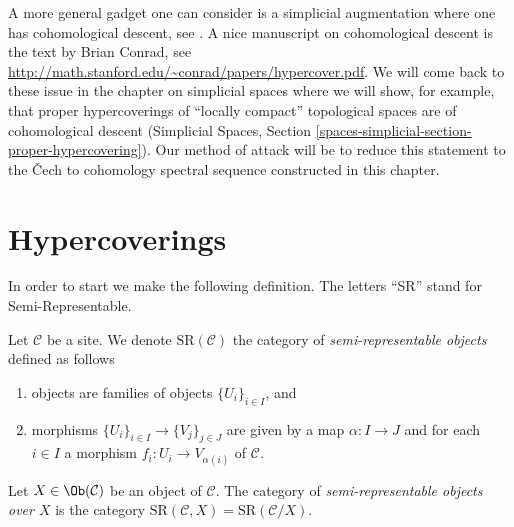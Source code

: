 \medskip\noindent
A more general gadget one can consider is a simplicial augmentation where
one has cohomological descent, see \cite[Expos\'e Vbis]{SGA4}. A nice
manuscript on cohomological descent is the text by Brian Conrad, see
\url{http://math.stanford.edu/~conrad/papers/hypercover.pdf}.
We will come back to these issue in the chapter on simplicial spaces
where we will show, for example, that proper hypercoverings of
``locally compact'' topological spaces are of cohomological
descent (Simplicial Spaces, Section
\ref{spaces-simplicial-section-proper-hypercovering}).
Our method of attack will be to reduce this statement to the {\v C}ech to
cohomology spectral sequence constructed in this chapter.






























\section{Hypercoverings}
\label{section-hypercoverings}

\noindent
In order to start we make the following definition.
The letters ``SR'' stand for Semi-Representable.

\begin{definition}
\label{definition-SR}
Let $\mathcal{C}$ be a site. We denote $\text{SR}(\mathcal{C})$
the category of {\it semi-representable objects} defined as follows
\begin{enumerate}
\item objects are families of objects $\{U_i\}_{i \in I}$, and
\item morphisms $\{U_i\}_{i \in I} \to \{V_j\}_{j \in J}$ are given by
a map $\alpha : I \to J$ and for each $i \in I$
a morphism $f_i : U_i \to V_{\alpha(i)}$ of $\mathcal{C}$.
\end{enumerate}
Let $X \in \Ob(\mathcal{C})$ be an object of $\mathcal{C}$.
The category of {\it semi-representable objects over $X$}
is the category
$\text{SR}(\mathcal{C}, X) = \text{SR}(\mathcal{C}/X)$.
\end{definition}

